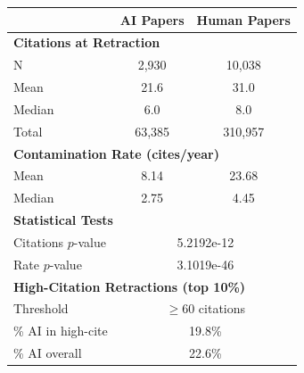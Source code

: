 \begin{tabular}{lcc}
\toprule
& \textbf{AI Papers} & \textbf{Human Papers} \\
\midrule
\multicolumn{3}{l}{\textbf{Citations at Retraction}} \\
\quad N & 2,930 & 10,038 \\
\quad Mean & 21.6 & 31.0 \\
\quad Median & 6.0 & 8.0 \\
\quad Total & 63,385 & 310,957 \\
\midrule
\multicolumn{3}{l}{\textbf{Contamination Rate (cites/year)}} \\
\quad Mean & 8.14 & 23.68 \\
\quad Median & 2.75 & 4.45 \\
\midrule
\multicolumn{3}{l}{\textbf{Statistical Tests}} \\
\quad Citations $p$-value & \multicolumn{2}{c}{5.2192e-12} \\
\quad Rate $p$-value & \multicolumn{2}{c}{3.1019e-46} \\
\midrule
\multicolumn{3}{l}{\textbf{High-Citation Retractions (top 10\%)}} \\
\quad Threshold & \multicolumn{2}{c}{$\geq 60$ citations} \\
\quad \% AI in high-cite & \multicolumn{2}{c}{19.8\%} \\
\quad \% AI overall & \multicolumn{2}{c}{22.6\%} \\
\bottomrule
\end{tabular}